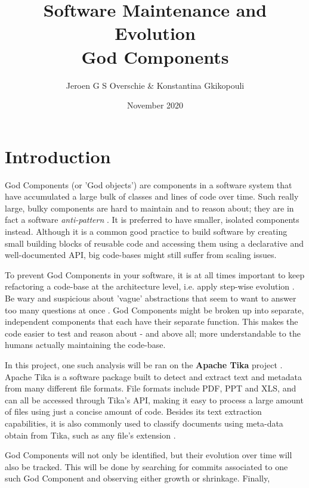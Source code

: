 \documentclass{article}
\title{Software Maintenance and Evolution \\God Components}
\author{Jeroen G S Overschie \& Konstantina Gkikopouli}
\date{November 2020}
\begin{document}
\maketitle

\tableofcontents
\newpage

\section{Introduction}
God Components (or 'God objects') are components in a software system that have accumulated a large bulk of classes and lines of code over time. Such really large, bulky components are hard to maintain and to reason about; they are in fact a software \textit{anti-pattern} \citep{smith2000software}. It is preferred to have smaller, isolated components instead. Although it is a common good practice to build software by creating small building blocks of reusable code and accessing them using a declarative and well-documented API, big code-bases might still suffer from scaling issues.

To prevent God Components in your software, it is at all times important to keep refactoring a code-base at the architecture level, i.e. apply step-wise evolution \citep{toward_a_catalogue_of_architetural_bad_smells}. Be wary and suspicious about 'vague' abstractions that seem to want to answer too many questions at once \citep{riel1996object}. God Components might be broken up into separate, independent components that each have their separate function. This makes the code easier to test and reason about - and above all; more understandable to the humans actually maintaining the code-base.

In this project, one such analysis will be ran on the \textbf{Apache Tika} project \citep{apache_software_foundation_2020}. Apache Tika is a software package built to detect and extract text and metadata from many different file formats. File formats include PDF, PPT and XLS, and can all be accessed through Tika's API, making it easy to process a large amount of files using just a concise amount of code. Besides its text extraction capabilities, it is also commonly used to classify documents using meta-data obtain from Tika, such as any file's extension \citep{Tika}.

God Components will not only be identified, but their evolution over time will also be tracked. This will be done by searching for commits associated to one such God Component and observing either growth or shrinkage. Finally, 
\end{document}
